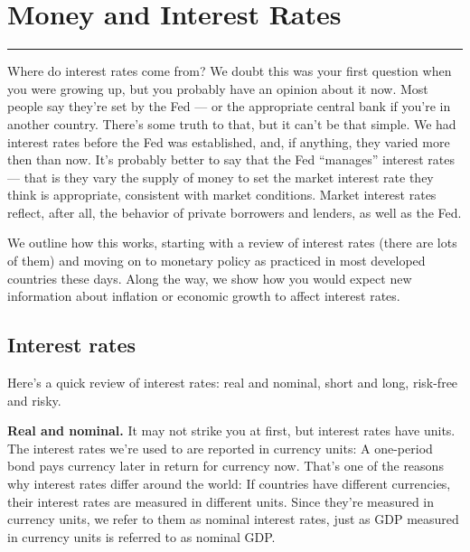 \chapter{Money and Interest Rates}\label{chp:mpir}
\hypertarget{monpol}{}


\rule{\textwidth}{1pt}

Where do interest rates come from?
We doubt this was your first question when you were growing up,
but you probably have an opinion about it now.
Most people say they're set by the Fed --- or the appropriate central bank if you're in another country.
There's some truth to that, but it can't be that simple. We had interest rates before the Fed was established,
and, if anything, they varied more then than now.
It's probably better to say that the Fed ``manages'' interest
rates --- that is they vary the supply of money to set the market interest rate
they think is appropriate, consistent with market conditions. Market
interest rates reflect, after all, the behavior of private
borrowers and lenders, as well as the Fed.

We outline how this works, starting with
a review of interest rates (there are lots of them)
and moving on to monetary policy as practiced in most
developed countries these days.
Along the way, we show how you would expect new information
about inflation or economic growth to affect interest rates.

\begin{comment}
*** predictability critical...

Commitment devices...
Gold and commodity money?  fixed exch rate?
Independent central bank \index{central bank}?
\end{comment}


\section{Interest rates}

Here's a quick review of interest rates:  real and nominal,
short and long, risk-free and risky.

\textbf{Real and nominal.} It may not strike you at first, but interest rates have units.
The  interest rates
 we're used to are reported in currency units:
A one-period bond  pays currency later in return for
currency now.
That's one of the reasons why interest rates differ around the world:
If countries have different currencies, their interest rates
are measured in different units.
Since they're measured in currency units, we refer to them
as nominal interest rates,
just as GDP measured in currency units is referred to
as nominal GDP.

